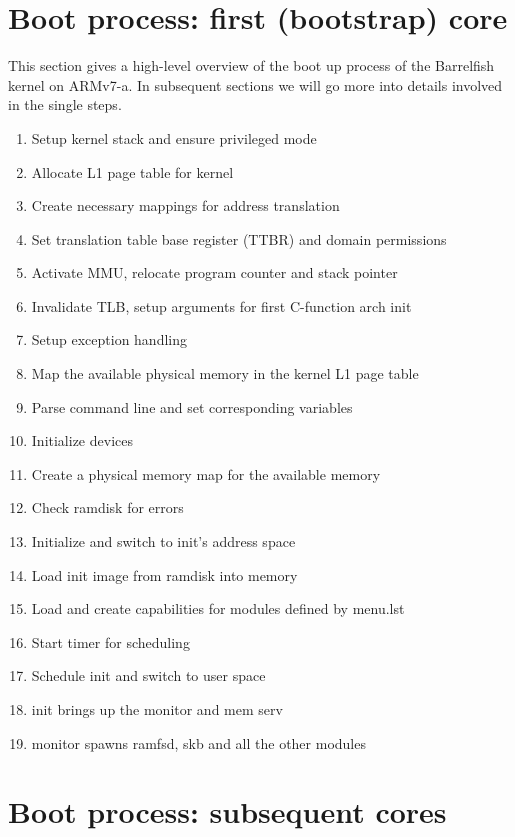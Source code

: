 \documentclass[a4paper,twoside]{report} %
\begin{document}
\section{Boot process: first (bootstrap) core}


This section gives a high-level overview of the boot up process of the
Barrelfish
kernel on ARMv7-a. In subsequent sections we will go more into details
involved
in the single steps.
\begin{enumerate}
\item Setup kernel stack and ensure privileged mode
\item Allocate L1 page table for kernel
\item Create necessary mappings for address translation
\item Set translation table base register (TTBR) and domain
  permissions
\item Activate MMU, relocate program counter and stack pointer
\item Invalidate TLB, setup arguments for first C-function arch init
\item Setup exception handling
\item Map the available physical memory in the kernel L1 page table
\item Parse command line and set corresponding variables
\item Initialize devices
\item Create a physical memory map for the available memory
\item Check ramdisk for errors
\item Initialize and switch to init’s address space
\item Load init image from ramdisk into memory
\item Load and create capabilities for modules defined by menu.lst
\item Start timer for scheduling
\item Schedule init and switch to user space
\item init brings up the monitor and mem serv
\item monitor spawns ramfsd, skb and all the other modules
\end{enumerate}

\section{Boot process: subsequent cores}
\end{document}
